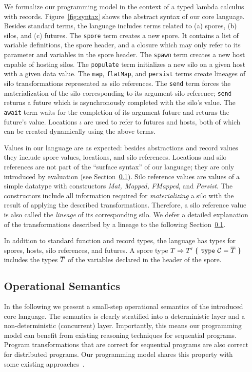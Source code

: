 We formalize our programming model in the context of a typed lambda
calculus with records. Figure~\ref{fig:syntax} shows the abstract
syntax of our core language. Besides standard terms, the language
includes terms related to (a) spores, (b) silos, and (c) futures. The
\verb|spore| term creates a new spore. It contains a list of variable
definitions, the spore header, and a closure which may only refer to
its parameter and variables in the spore header. The \verb|spawn| term
creates a new host capable of hosting silos. The \verb|populate| term
initializes a new silo on a given host with a given data value.  The
\verb|map|, \verb|flatMap|, and \verb|persist| terms create lineages
of silo transformations represented as silo references.  The
\verb|send| term forces the materialization of the silo corresponding
to its argument silo reference; \verb|send| returns a future which is
asynchronously completed with the silo's value. The \verb|await| term
waits for the completion of its argument future and returns the
future's value.  Locations $\iota$ are used to refer to futures and
hosts, both of which can be created dynamically using the above terms.

Values in our language are as expected: besides abstractions and
record values they include spore values, locations, and silo
references. Locations and silo references are not part of the
``surface syntax'' of our language; they are only introduced by
evaluation (see Section~\ref{sec:opsem}). Silo reference values are
values of a simple datatype with constructors {\em Mat, Mapped,
  FMapped}, and {\em Persist}. The constructors include all
information required for {\em materializing} a silo with the result of
applying the described transformations. Therefore, a silo reference
value is also called the {\em lineage} of its corresponding silo. We
defer a detailed explanation of the transformations described by a
lineage to the following Section~\ref{sec:opsem}.

In addition to standard function and record types, the language has
types for spores, hosts, silo references, and futures. A spore type $T
\Rightarrow T'~\{~\texttt{type}~\mathcal{C} = \overline{T}~\}$ includes the
types $\overline{T}$ of the variables declared in the header of the spore.

\subsection{Operational Semantics}\label{sec:opsem}

In the following we present a small-step operational semantics of the
introduced core language. The semantics is clearly stratified into a
deterministic layer and a non-deterministic (concurrent)
layer. Importantly, this means our programming model can benefit from
existing reasoning techniques for sequential programs. Program
transformations that are correct for sequential programs are also
correct for distributed programs. Our programming model shares this
property with some existing approaches~\cite{ConcurrentHaskell}.

